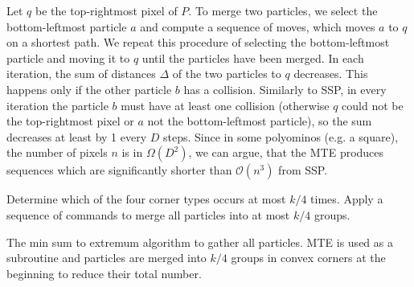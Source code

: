 Let $q$ be the top-rightmost pixel of $P$. To merge two particles, we select the bottom-leftmost particle $a$ and compute a sequence of moves, which moves $a$ to $q$ on a shortest path. We repeat this procedure of selecting the bottom-leftmost particle and moving it to $q$ until the particles have been merged. In each iteration, the sum of distances $\Delta$ of the two particles to $q$ decreases. This happens only if the other particle $b$ has a collision. Similarly to SSP, in every iteration the particle $b$ must have at least one collision (otherwise $q$ could not be the top-rightmost pixel or $a$ not the bottom-leftmost particle), so the sum decreases at least by 1 every $D$ steps. Since in some polyominos (e.g. a square), the number of pixels $n$ is in $\Omega (D^2)$, we can argue, that the MTE produces sequences which are significantly shorter than $\mathcal{O}(n^3)$ from SSP.

\begin{algorithm}[ht]
    
    Determine which of the four corner types occurs at most $k/4$ times. \;
    Apply a sequence of commands to merge all particles into at most $k/4$ groups.


    
    \caption[The Min Sum To Extremum algorithm]{The min sum to extremum algorithm to gather all particles. MTE is used as a subroutine and particles are merged into $k/4$ groups in convex corners at the beginning to reduce their total number.}\label{alg:MSTE}
\end{algorithm}

